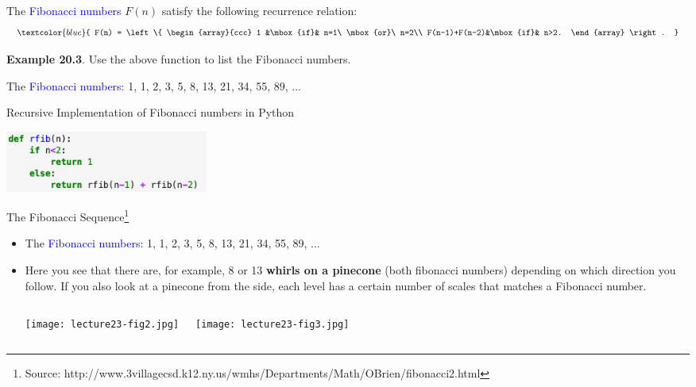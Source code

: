 \documentclass[aspectratio=169]{beamer}
\providecommand{\Blue}[1]{\textcolor{blue}{#1}}
\begin{document}
\begin{frame}[plain]{ }
 
   The \Blue{Fibonacci numbers} $F(n)$ satisfy the following recurrence relation:
     \[ \Blue{
          F(n) = \left\{ \begin{array}{ccc}
                          1 &\mbox{if}& n=1\ \mbox{or}\ n=2\\
                          F(n-1)+F(n-2)&\mbox{if}& n>2.
                         \end{array}
                  \right. 
              }
     \]
  
   {\bf Example 20.3}. Use the above function to list the Fibonacci numbers.
   \pause
   \medskip
   
    The \Blue{Fibonacci numbers:} 1, 1, 2, 3, 5, 8, 13, 21, 34, 55, 89, ...
   \medskip
  
	\begin{center}
	         Recursive Implementation of Fibonacci numbers in Python
	         
	      \includegraphics[height=2cm]{./img/lecture20-fig2.png}
	  \end{center}  


 
  
\end{frame}


\iffalse

\begin{frame}[plain]{The Fibonacci Sequence\footnote{Source: 
  http://www.3villagecsd.k12.ny.us/wmhs/Departments/Math/OBrien/fibonacci2.html}
   }
 \begin{itemize}
   \item  The \Blue{Fibonacci numbers:} 1, 1, 2, 3, 5, 8, 13, 21, 34, 55, 89, ...
  \item Here you see that there are, for example, 8 or 13 {\bf whirls on a pinecone} 
    (both fibonacci numbers) depending on which direction you follow. If you also look at 
  a pinecone from the side, each level has a certain number of scales that matches a Fibonacci number.
    \begin{columns}[c]
        \begin{center}
	      \texttt{[image: lecture23-fig2.jpg]}
	  \end{center} 
	\begin{center}
	      \texttt{[image: lecture23-fig3.jpg]}
	  \end{center}  
   \end{columns}
 \end{itemize}

\end{frame}
\end{document}
